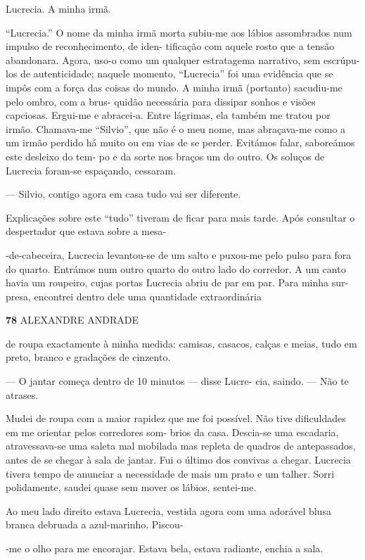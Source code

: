 Lucrecia. A minha irmã.

``Lucrecia.'' O nome da minha irmã morta subiu-me aos lábios assombrados
num impulso de reconhecimento, de iden- tificação com aquele rosto que a
tensão abandonara. Agora, uso-o como um qualquer estratagema narrativo,
sem escrúpu- los de autenticidade; naquele momento, ``Lucrecia'' foi uma
evidência que se impôs com a força das coisas do mundo. A minha irmã
(portanto) sacudiu-me pelo ombro, com a brus- quidão necessária para
dissipar sonhos e visões capciosas. Ergui-me e abracei-a. Entre
lágrimas, ela também me tratou por irmão. Chamava-me ``Silvio'', que não
é o meu nome, mas abraçava-me como a um irmão perdido há muito ou em
vias de se perder. Evitámos falar, saboreámos este desleixo do tem- po e
da sorte nos braços um do outro. Os soluços de Lucrecia foram-se
espaçando, cessaram.

--- Silvio, contigo agora em casa tudo vai ser diferente.

Explicações sobre este ``tudo'' tiveram de ficar para mais tarde. Após
consultar o despertador que estava sobre a mesa-

-de-cabeceira, Lucrecia levantou-se de um salto e puxou-me pelo pulso
para fora do quarto. Entrámos num outro quarto do outro lado do
corredor. A um canto havia um roupeiro, cujas portas Lucrecia abriu de
par em par. Para minha sur- presa, encontrei dentro dele uma quantidade
extraordinária

\textbf{78 }ALEXANDRE ANDRADE

de roupa exactamente à minha medida: camisas, casacos, calças e meias,
tudo em preto, branco e gradações de cinzento.

--- O jantar começa dentro de 10 minutos --- disse Lucre- cia, saindo.
--- Não te atrases.

Mudei de roupa com a maior rapidez que me foi possível. Não tive
dificuldades em me orientar pelos corredores som- brios da casa.
Descia-se uma escadaria, atravessava-se uma saleta mal mobilada mas
repleta de quadros de antepassados, antes de se chegar à sala de jantar.
Fui o último dos convivas a chegar. Lucrecia tivera tempo de anunciar a
necessidade de mais um prato e um talher. Sorri polidamente, saudei
quase sem mover os lábios, sentei-me.

Ao meu lado direito estava Lucrecia, vestida agora com uma adorável
blusa branca debruada a azul-marinho. Piscou-

-me o olho para me encorajar. Estava bela, estava radiante, enchia a
sala.


